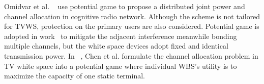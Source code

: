 \documentclass[times]{ettauth}
\newcommand{\ie}{i.e., }
\theoremstyle{mytheoremstyle}
\theoremstyle{mytheoremstyle}
\theoremstyle{mytheoremstyle}
\begin{document}
Omidvar et al. ~\cite{pimrc_2012} use potential game to propose a distributed joint power and channel allocation in cognitive radio network.
Although the scheme is not tailored for TVWS, protection on the primary users are also considered.
Potential game is adopted in work~\cite{Elias17} to mitigate the adjacent interference meanwhile bonding multiple channels, but the white space devices adopt fixed and identical transmission power.
In ~\cite{spectrum_sharing_tvspace_2012}, Chen et al. formulate the channel allocation problem in TV white space into a potential game where individual WBS's utility is to maximize the capacity of one static terminal.
\end{document}
